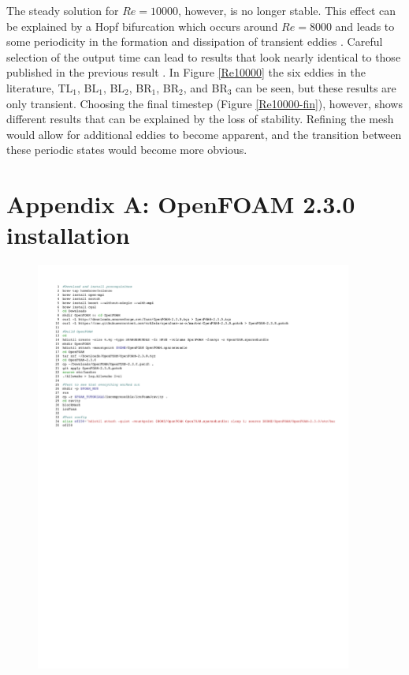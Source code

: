 \documentclass[twocolumn,10pt]{asme2ej}
\begin{document}
The steady solution for $Re = 10000$, however, is no longer stable. This effect can be explained by a Hopf bifurcation which occurs around $Re = 8000$ and leads to some periodicity in the formation and dissipation of transient eddies \cite{bruneau20062d}. Careful selection of the output time can lead to results that look nearly identical to those published in the previous result \cite{ghia1982high}. In Figure \ref{Re10000} the six eddies in the literature, TL$_1$, BL$_1$, BL$_2$, BR$_1$, BR$_2$, and BR$_3$ can be seen, but these results are only transient. Choosing the final timestep (Figure \ref{Re10000-fin}), however, shows different results that can be explained by the loss of stability. Refining the mesh would allow for additional eddies to become apparent, and the transition between these periodic states would become more obvious.




\clearpage
\onecolumn
\appendix
\section*{Appendix A: OpenFOAM 2.3.0 installation}

\begin{figure}[b]
\begin{center}
\includegraphics[page=1,width=0.93\textwidth]{of230_install.pdf}
\end{center}
\end{figure}

\end{document}
